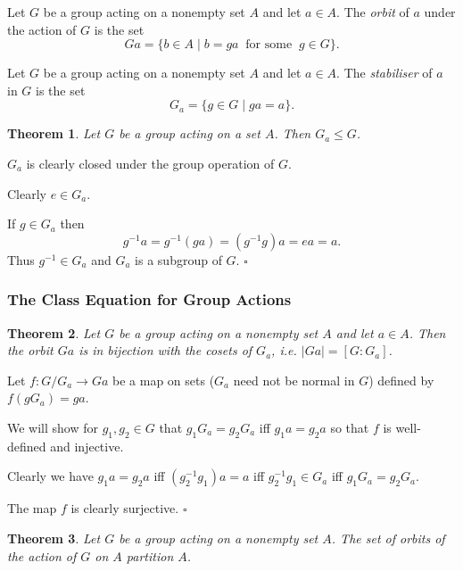 \documentclass[10pt]{article}
\newtheorem{theorem}{Theorem}[section]
\newenvironment{proof}[1][Proof]{\begin{trivlist}
\item[\hskip \labelsep {\itshape #1}]}{\end{trivlist}}
\newenvironment{definition}[1][Definition]{\begin{trivlist}
\item[\hskip \labelsep {\bfseries #1}]}{\end{trivlist}}
\begin{document}
\begin{definition}
Let $G$ be a group acting on a nonempty set $A$ and let $a \in A$. The \emph{orbit} of $a$ under the action of $G$ is the set
$$Ga = \{b \in A \;|\; b = ga \;\;\mbox{for some}\;\; g \in G\}.$$
\end{definition}

\begin{definition}
Let $G$ be a group acting on a nonempty set $A$ and let $a \in A$. The \emph{stabiliser} of $a$ in $G$ is the set
$$G_a = \{g \in G \;|\; ga = a\}.$$
\end{definition}

\begin{theorem}
Let $G$ be a group acting on a set $A$. Then $G_a \leq G$.
\end{theorem}

\begin{proof}
$G_a$ is clearly closed under the group operation of $G$.

Clearly $e \in G_a$.

If $g \in G_a$ then
$$g^{-1}a = g^{-1}(ga) = (g^{-1}g)a = ea = a.$$
Thus $g^{-1} \in G_a$ and $G_a$ is a subgroup of $G$. $\square$
\end{proof}

\subsubsection{The Class Equation for Group Actions}

\begin{theorem}
Let $G$ be a group acting on a nonempty set $A$ and let $a \in A$. Then the orbit $Ga$ is in bijection with the cosets of $G_a$, i.e. $|Ga| = [G:G_a]$.
\end{theorem}

\begin{proof}
Let $f : G/G_a \to Ga$ be a map on sets ($G_a$ need not be normal in $G$) defined by $f(gG_a) = ga$.

We will show for $g_1, g_2 \in G$ that $g_1G_a = g_2G_a$ iff $g_1a = g_2a$ so that $f$ is well-defined and injective.

Clearly we have $g_1a = g_2a$ iff $(g_2^{-1}g_1)a = a$ iff $g_2^{-1}g_1 \in G_a$ iff $g_1G_a = g_2G_a$.

The map $f$ is clearly surjective. $\square$
\end{proof}

\begin{theorem}
Let $G$ be a group acting on a nonempty set $A$. The set of orbits of the action of $G$ on $A$ partition $A$.
\end{theorem}
\end{document}
